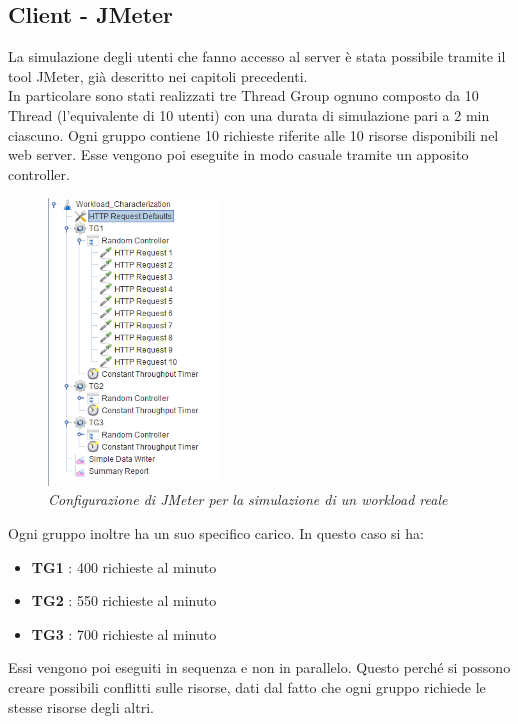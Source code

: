 \subsection{Client - JMeter}
La simulazione degli utenti che fanno accesso al server è stata possibile tramite il tool JMeter, già descritto nei capitoli precedenti. 
\\In particolare sono stati realizzati tre Thread Group ognuno composto da 10 Thread (l'equivalente di 10 utenti) con una durata di simulazione pari a 2 min ciascuno. Ogni gruppo contiene 10 richieste riferite alle 10 risorse disponibili nel web server. Esse vengono poi eseguite in modo casuale tramite un apposito controller. 
\begin{figure}[H]
	\centering
	\includegraphics[width=0.4\textwidth]{img/hw3/jmeter_reale.png}
	\caption{\textit{Configurazione di JMeter per la simulazione di un workload reale}}
\end{figure}
Ogni gruppo inoltre ha un suo specifico carico. In questo caso si ha:
\begin{itemize}
	\item \textbf{TG1} : 400 richieste al minuto
	\item \textbf{TG2} : 550 richieste al minuto
	\item \textbf{TG3} : 700 richieste al minuto
\end{itemize}
Essi vengono poi eseguiti in sequenza e non in parallelo. Questo perché si possono creare possibili conflitti sulle risorse, dati dal fatto che ogni gruppo richiede le stesse risorse degli altri. 
